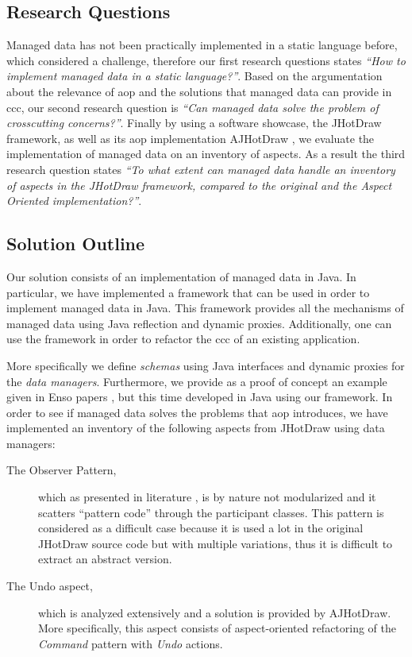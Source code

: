 \subsection{Research Questions}\label{Research Questions}
Managed data has not been practically implemented in a static language before, which considered a challenge, therefore our first research questions states 
\textit{``How to implement managed data in a static language?''}.
Based on the argumentation about the relevance of \ac{aop} and the solutions that managed data can provide in \acrlong{ccc}, our second research question is \textit{``Can managed data solve the problem of crosscutting concerns?''}. 
Finally by using a software showcase, the JHotDraw framework, as well as its \ac{aop} implementation AJHotDraw \cite{marinajhotdraw}, 
we evaluate the implementation of managed data on an inventory of aspects. 
As a result the third research question states \textit{``To what extent can managed data handle an inventory of aspects in the JHotDraw framework, compared to the original and the Aspect Oriented implementation?''}.

\subsection{Solution Outline}\label{Solution Outline}
Our solution consists of an implementation of managed data in Java.
In particular, we have implemented a framework that can be used in order to implement managed data in Java.
This framework provides all the mechanisms of managed data using Java reflection and dynamic proxies. Additionally, one can use the framework in order to refactor the \ac{ccc} of an existing application.

More specifically we define \textit{schemas} using Java interfaces and dynamic proxies for the \textit{data managers}. 
Furthermore, we provide as a proof of concept an example given in Enso papers \cite{loh2012managed}, but this time developed in Java using our framework. 
In order to see if managed data solves the problems that \ac{aop} introduces, we have implemented an inventory of the following aspects from JHotDraw using data managers:
\begin{description}

  \item[The Observer Pattern,]  which as presented in literature \cite{tourwe2003existence} \cite{hannemann2005role} \cite{marin2005approach}, is by nature not modularized and it scatters ``pattern code'' through the participant classes. 
  This pattern is considered as a difficult case because it is used a lot in the original JHotDraw source code but with multiple variations, thus it is difficult to extract an abstract version.

  \item[The Undo aspect,] which is analyzed extensively \cite{marin2004refactoring} and a solution is provided by AJHotDraw. 
  More specifically, this aspect consists of aspect-oriented refactoring of the \textit{Command} pattern with \textit{Undo} actions.

\end{description}


